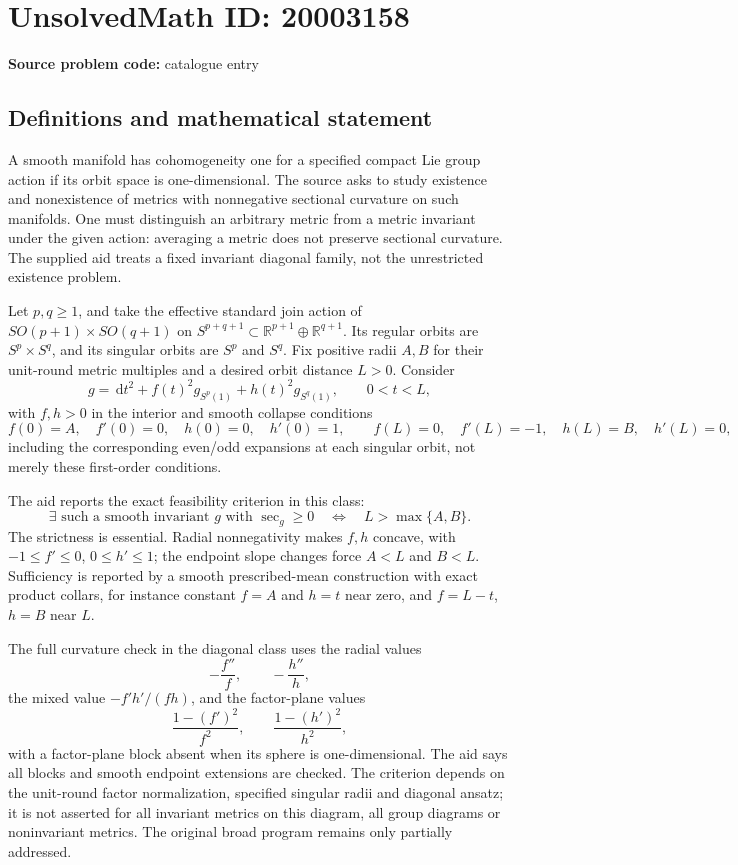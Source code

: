 \documentclass[11pt]{article}
\newcommand{\R}{\mathbb{R}}
\newcommand{\dd}{\,\mathrm{d}}
\begin{document}
\section*{UnsolvedMath ID: 20003158}
\textbf{Source problem code:} catalogue entry
\subsection{Definitions and mathematical statement}
A smooth manifold has cohomogeneity one for a specified compact Lie group action if its orbit space is one-dimensional. The source asks to study existence and nonexistence of metrics with nonnegative sectional curvature on such manifolds. One must distinguish an arbitrary metric from a metric invariant under the given action: averaging a metric does not preserve sectional curvature. The supplied aid treats a fixed invariant diagonal family, not the unrestricted existence problem.

Let \(p,q\ge1\), and take the effective standard join action of \(SO(p+1)\times SO(q+1)\) on \(S^{p+q+1}\subset\R^{p+1}\oplus\R^{q+1}\). Its regular orbits are \(S^p\times S^q\), and its singular orbits are \(S^p\) and \(S^q\). Fix positive radii \(A,B\) for their unit-round metric multiples and a desired orbit distance \(L>0\). Consider
\[
g=\dd t^2+f(t)^2g_{S^p(1)}+h(t)^2g_{S^q(1)},\qquad 0<t<L,
\]
with \(f,h>0\) in the interior and smooth collapse conditions
\[
f(0)=A,\quad f'(0)=0,\quad h(0)=0,\quad h'(0)=1,
\qquad
f(L)=0,\quad f'(L)=-1,\quad h(L)=B,\quad h'(L)=0,
\]
including the corresponding even/odd expansions at each singular orbit, not merely these first-order conditions.

The aid reports the exact feasibility criterion in this class:
\[
\exists\text{ such a smooth invariant }g\text{ with }\sec_g\ge0
\quad\Longleftrightarrow\quad L>\max\{A,B\}.
\]
The strictness is essential. Radial nonnegativity makes \(f,h\) concave, with \(-1\le f'\le0\), \(0\le h'\le1\); the endpoint slope changes force \(A<L\) and \(B<L\). Sufficiency is reported by a smooth prescribed-mean construction with exact product collars, for instance constant \(f=A\) and \(h=t\) near zero, and \(f=L-t\), \(h=B\) near \(L\).

The full curvature check in the diagonal class uses the radial values
\[
-\frac{f''}{f},\qquad-\frac{h''}{h},
\]
the mixed value \(-f'h'/(fh)\), and the factor-plane values
\[
\frac{1-(f')^2}{f^2},\qquad\frac{1-(h')^2}{h^2},
\]
with a factor-plane block absent when its sphere is one-dimensional. The aid says all blocks and smooth endpoint extensions are checked. The criterion depends on the unit-round factor normalization, specified singular radii and diagonal ansatz; it is not asserted for all invariant metrics on this diagram, all group diagrams or noninvariant metrics. The original broad program remains only partially addressed.
\end{document}
